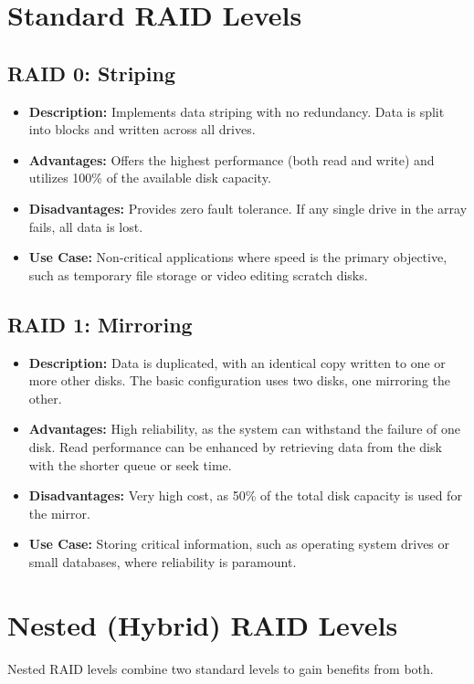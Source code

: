 \section{Standard RAID Levels}

\subsection{RAID 0: Striping}
\begin{itemize}
    \item \textbf{Description:} Implements data striping with no redundancy. Data is split into blocks and written across all drives.
    \item \textbf{Advantages:} Offers the highest performance (both read and write) and utilizes 100\% of the available disk capacity.
    \item \textbf{Disadvantages:} Provides zero fault tolerance. If any single drive in the array fails, all data is lost.
    \item \textbf{Use Case:} Non-critical applications where speed is the primary objective, such as temporary file storage or video editing scratch disks.
\end{itemize}

\subsection{RAID 1: Mirroring}
\begin{itemize}
    \item \textbf{Description:} Data is duplicated, with an identical copy written to one or more other disks. The basic configuration uses two disks, one mirroring the other.
    \item \textbf{Advantages:} High reliability, as the system can withstand the failure of one disk. Read performance can be enhanced by retrieving data from the disk with the shorter queue or seek time.
    \item \textbf{Disadvantages:} Very high cost, as 50\% of the total disk capacity is used for the mirror.
    \item \textbf{Use Case:} Storing critical information, such as operating system drives or small databases, where reliability is paramount.
\end{itemize}

\section{Nested (Hybrid) RAID Levels}
Nested RAID levels combine two standard levels to gain benefits from both.

